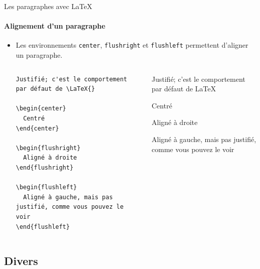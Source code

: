 \begin{frame}[fragile]{Les paragraphes avec \LaTeX{}}
  \framesubtitle{Alignement d'un paragraphe}
  \begin{itemize}
      \item Les environnements \lstinline|center|, \lstinline|flushright| et \lstinline|flushleft| permettent d'aligner un paragraphe.
    \begin{columns}
      \begin{column}{0.4\textwidth}
        \begin{lstlisting}[style=nonumbers]
Justifié; c'est le comportement par défaut de \LaTeX{}

\begin{center}
  Centré
\end{center}

\begin{flushright}
  Aligné à droite
\end{flushright}

\begin{flushleft}
  Aligné à gauche, mais pas justifié, comme vous pouvez le voir
\end{flushleft}
        \end{lstlisting}
      \end{column}
      \begin{column}{0.6\textwidth}
        \begin{mdframed}
          Justifié; c'est le comportement par défaut de \LaTeX{}

          \begin{center}
            Centré
          \end{center}

          \begin{flushright}
            Aligné à droite
          \end{flushright}

          \begin{flushleft}
            Aligné à gauche, mais pas justifié, comme vous pouvez le voir
          \end{flushleft}
        \end{mdframed}
      \end{column}
    \end{columns}
  \end{itemize}
\end{frame}

\subsection{Divers}

